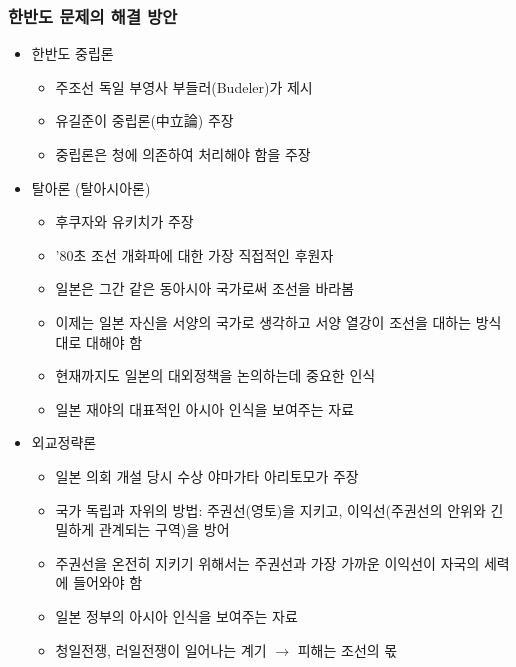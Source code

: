 \subsubsection*{한반도 문제의 해결 방안}
\begin{itemize}
    \item 한반도 중립론
    \begin{itemize}
        \item 주조선 독일 부영사 부들러(Budeler)가 제시
        \item 유길준이 중립론(中立論) 주장
        \item 중립론은 청에 의존하여 처리해야 함을 주장
    \end{itemize}
    \item 탈아론 (탈아시아론)
    \begin{itemize}
        \item 후쿠자와 유키치가 주장
        \item '80초 조선 개화파에 대한 가장 직접적인 후원자
        \item 일본은 그간 같은 동아시아 국가로써 조선을 바라봄
        \item 이제는 일본 자신을 서양의 국가로 생각하고 서양 열강이 조선을 대하는 방식대로 대해야 함
        \item 현재까지도 일본의 대외정책을 논의하는데 중요한 인식
        \item 일본 재야의 대표적인 아시아 인식을 보여주는 자료
    \end{itemize}
    \item 외교정략론
    \begin{itemize}
        \item 일본 의회 개설 당시 수상 야마가타 아리토모가 주장
        \item 국가 독립과 자위의 방법: 주권선(영토)을 지키고, 이익선(주권선의 안위와 긴밀하게 관계되는 구역)을 방어
        \item 주권선을 온전히 지키기 위해서는 주권선과 가장 가까운 이익선이 자국의 세력에 들어와야 함
        \item 일본 정부의 아시아 인식을 보여주는 자료
        \item 청일전쟁, 러일전쟁이 일어나는 계기 $\rightarrow$ 피해는 조선의 몫
    \end{itemize}
\end{itemize}
